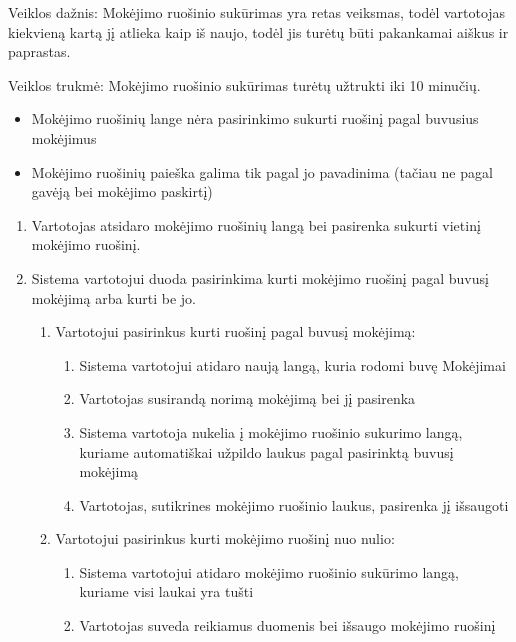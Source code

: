 \documentclass{VUMIFPSkursinis}
\begin{document}
Veiklos dažnis: Mokėjimo ruošinio sukūrimas yra retas veiksmas, todėl vartotojas kiekvieną kartą jį atlieka kaip iš naujo, todėl jis turėtų būti pakankamai aiškus ir paprastas. \par
Veiklos trukmė: Mokėjimo ruošinio sukūrimas turėtų užtrukti iki 10 minučių.
\begin{itemize}
	\item Mokėjimo ruošinių lange nėra pasirinkimo sukurti ruošinį pagal buvusius mokėjimus
	\item Mokėjimo ruošinių paieška galima tik pagal jo pavadinima (tačiau ne pagal gavėją bei mokėjimo paskirtį)
\end{itemize}
\begin{enumerate}
	\item Vartotojas atsidaro mokėjimo ruošinių langą bei pasirenka sukurti vietinį mokėjimo ruošinį.
	\item Sistema vartotojui duoda pasirinkima kurti mokėjimo ruošinį pagal buvusį mokėjimą arba kurti be jo.
	\begin{enumerate}
		\item Vartotojui pasirinkus kurti ruošinį pagal buvusį mokėjimą:
		\begin{enumerate}
			\item Sistema vartotojui atidaro naują langą, kuria rodomi buvę Mokėjimai
			\item Vartotojas susirandą norimą mokėjimą bei jį pasirenka
			\item Sistema vartotoja nukelia į mokėjimo ruošinio sukurimo langą, kuriame automatiškai užpildo laukus pagal pasirinktą buvusį mokėjimą
			\item Vartotojas, sutikrines mokėjimo ruošinio laukus, pasirenka jį išsaugoti
		\end{enumerate}
		\item Vartotojui pasirinkus kurti mokėjimo ruošinį nuo nulio:
		\begin{enumerate}
			\item Sistema vartotojui atidaro mokėjimo ruošinio sukūrimo langą, kuriame visi laukai yra tušti
			\item Vartotojas suveda reikiamus duomenis bei išsaugo mokėjimo ruošinį
		\end{enumerate}
	\end{enumerate}
\end{enumerate}
\end{document}
